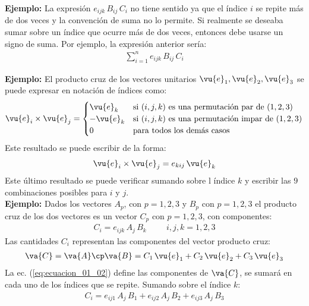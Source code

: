\noindent
\textbf{Ejemplo: } La expresión $e_{ijk} \, B_{ij} \, C_{i}$ no tiene sentido ya que el índice $i$ se repite más de dos veces y la convención de suma no lo permite. Si realmente se deseaba sumar sobre un índice que ocurre más de dos veces, entonces debe usarse un signo de suma. Por ejemplo, la expresión anterior sería:
\begin{align*}
\sum_{i=1}^{n} e_{ijk} \, B_{ij} \, C_{i}
\end{align*}

\noindent
\textbf{Ejemplo: } El producto cruz de los vectores unitarios $\vu{e}_{1}, \vu{e}_{2}, \vu{e}_{3}$ se puede expresar en notación de índices como: 
\begin{align*}
\vu{e}_{i} \times \vu{e}_{j} = \begin{cases}
\vu{e}_{k} & \mbox{si } (i, j, k) \mbox{ es una permutación par de } (1, 2, 3) \\
-\vu{e}_{k} & \mbox{si } (i, j, k) \mbox{ es una permutación impar de } (1, 2, 3) \\
0 & \mbox{para todos los demás casos}
\end{cases}
\end{align*}
Este resultado se puede escribir de la forma:
\begin{align*}
\vu{e}_{i} \times \vu{e}_{j} = e_{kij} \, \vu{e}_{k}
\end{align*}
Este último resultado se puede verificar sumando sobre l índice $k$ y escribir las $9$ combinaciones posibles para $i$ y $j$.
\\[0.5em]
\noindent
\textbf{Ejemplo: } Dados los vectores $A_{p}$, con $p = 1, 2, 3$ y $B_{p}$ con $p = 1, 2, 3$ el producto cruz de los dos vectores  es un vector $C_{p}$ con $p = 1, 2, 3$, con componentes:
\begin{align}
C_{i} = e_{ijk} \, A_{j} \, B_{k} \hspace{1cm} i, j, k = 1, 2, 3
\label{eq:ecuacion_01_02}
\end{align}
Las cantidades $C_{i}$ representan las componentes del vector producto cruz:
\begin{align*}
\va{C} = \va{A} \cp \va{B} = C_{1} \, \vu{e}_{1} + C_{2} \, \vu{e}_{2} + C_{3} \, \vu{e}_{3} 
\end{align*}
La ec. (\ref{eq:ecuacion_01_02}) define las componentes de $\va{C}$, se sumará en cada uno de los índices que
se repite. Sumando sobre el índice $k$:
\begin{align}
C_{i} = e_{ij1} \, A_{j} \, B_{1} + e_{ij2} \, A_{j} \, B_{2} + e_{ij3} \, A_{j} \, B_{3}
\label{eq:ecuacion_01_03}     
\end{align}
